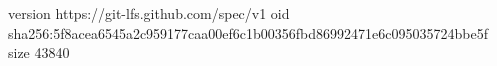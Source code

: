 version https://git-lfs.github.com/spec/v1
oid sha256:5f8acea6545a2c959177caa00ef6c1b00356fbd86992471e6c095035724bbe5f
size 43840
